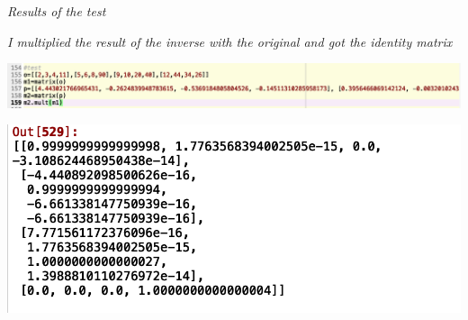 \documentclass{article}
\begin{document}
\begin{itemize}
\begin{center}
       \vspace{0.2em}
       
       \emph{\small{Results of the test}}
       \end{center}

\vspace{0.2em}

\end{itemize}
\emph{\small{I multiplied the result of the inverse with the original and got the identity matrix}}
\begin{center}
        \includegraphics[scale=0.5]{Images/1}

       \includegraphics[scale=0.37]{Images/1p}
\end{center}

\vspace{0.2em}
\end{document}

